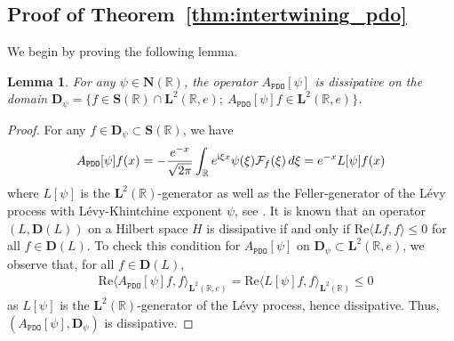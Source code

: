\documentclass[12pt]{amsart}
\newcommand{\hlabel}{\phantomsection\label}
\numberwithin{equation}{section}
\newcommand{\bb}{\mathbb}
\newcommand{\cc}{\mathcal}
\renewcommand{\le}{\leqslant}
\renewcommand{\Re}{\textrm{Re}}
\newcommand{\tb}{}
\newcommand{\ttt}{\mathtt}
\newcommand{\bmrm}[2][2]{\mathbf{#2}^{#1}}
\newcommand{\D}{\mathbf{D}}
\renewcommand{\SS}{\mathbf{S}}
\newcommand{\NN}{\mathbf{N}}
\newtheorem{lem}[thm]{Lemma}
\theoremstyle{definition}
\theoremstyle{assump}
\theoremstyle{remark}
\newtheorem{rem}[thm]{Remark}
\begin{document}
{%

\subsection{Proof of Theorem~\ref{thm:intertwining_pdo}}\hlabel{ss:pf_intertwining_pdo} We begin by proving the following lemma. %
\begin{lem}\hlabel{lem:dissipativity}
	For any $\psi\in\mathbf{N}(\bb{R})$, the operator $A_\ttt{PDO}[\psi]$ is dissipative on the domain $\D_\psi=\{f\in\SS(\bb{R})\cap\bmrm{L}(\bb{R},e);\ A_\ttt{PDO}[\psi]f\in\bmrm{L}(\bb{R},e)\}$.
\end{lem}
\begin{proof}
For any  $f\in\D_\psi \subset \SS(\bb{R})$, we have
\begin{align} \label{eq:PDO_L}
	A_\ttt{PDO}[\psi]f(x)=-\frac{e^{-x}}{\sqrt{2\pi}}\int_\bb{R} e^{{\rm{i}}\xi  x}\psi(\xi)\mathcal{F}_{f}(\xi)\,d\xi=e^{-x}L[\psi]f(x)
\end{align}
where $L[\psi]$ is the $\bmrm{L}(\bb{R})$-generator as well as the Feller-generator  of the L\'evy process with L\'evy-Khintchine exponent $\psi$, see \cite[Section 3.4.1 and Theorem 3.3.3]{Applebaum}. It is known that an operator $(L,\D(L))$ on a Hilbert space $H$ is dissipative if and only if $\Re\langle Lf,f\rangle\le 0$ for all $f\in\D(L)$. To check this condition for $A_\ttt{PDO}[\psi]$ on $\D_\psi\subset\bmrm{L}(\bb{R},e)$, we observe that, for all $f\in\D(L)$,
\begin{align}
	&\Re \langle A_\ttt{PDO}[\psi]f, f\rangle_{\bmrm{L}(\bb{R},e)}=\Re\langle L[\psi]f, f\rangle_{\bmrm{L}(\bb{R})}\le 0
\end{align}
as $L[\psi]$ is the $\bmrm{L}(\bb{R})$-generator of the L\'evy process, hence dissipative. Thus, $(A_\ttt{PDO}[\psi],\D_\psi)$ is dissipative.

\end{proof}}
\end{document}
